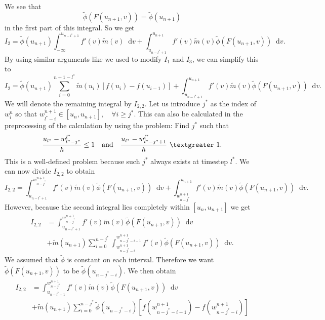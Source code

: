 \documentclass[12pt,a4paper,twoside, open=right]{scrreprt}
\theoremstyle{definition}
\theoremstyle{plain}
\newcommand{\g}{~\textgreater ~}
\newcommand{\D}{\mathop{}\!\mathrm{d}}
\begin{document}
We see that \begin{equation}
    \tilde\phi(F(u_{n+1},v))=\tilde\phi(u_{n+1})
\end{equation}
in the first part of this integral. So we get 
\begin{equation}
    I_2 = \tilde\phi(u_{n+1})\int_{-\infty}^{u_{n-l^*+1}}f'(v)\tilde{m}(v)\D v+ \int_{u_{n-l^* +1}}^{u_{n+1}}f'(v)\tilde{m}(v)\tilde{\phi}(F(u_{n+1},v))\D v.
\end{equation}
By using similar arguments like we used to modify $I_1$ and $I_3$, we can simplify this to 
\begin{equation}
    I_2 = \tilde{\phi}(u_{n+1})\sum_{i=0}^{n+1-l^*}\tilde{m}(u_i)[f(u_i)-f(u_{i-1})]+ \int_{u_{n-l^* +1}}^{u_{n+1}}f'(v)\tilde{m}(v)\tilde{\phi}(F(u_{n+1},v))\D v.
\end{equation}
We will denote the remaining integral by $I_{2,2}$. Let us introduce $j^*$ as the index of $w_i^{n}$ so that $w_{l^*-i}^{n+1}\in[u_n,u_{n+1}],\quad\forall i\ge j^*$. This can also be calculated in the preprocessing of the calculation by using the problem: Find $j^*$ such that
\begin{equation}
    \frac{u_{l^*}-w_{l^*-j^*}^{l^*}}{h}\le 1 \quad \text{and} \quad\frac{u_{l^*}-w_{l^*-j^*+1}^{l^*}}{h}\g 1.
\end{equation}
This is a well-defined problem because such $j^*$ always exists at timestep $l^*$. We can now divide $I_{2,2}$ to obtain
\begin{equation}
    I_{2,2}= \int_{u_{n-l^*+1}}^{w^{n+1}_{n-j^*}}f'(v)\tilde{m}(v)\tilde{\phi}(F(u_{n+1},v))\D v + \int_{w^{n+1}_{n-j^*}}^{u_{n+1}}f'(v)\tilde{m}(v)\tilde{\phi}(F(u_{n+1},v))\D v.
\end{equation}
However, because the second integral lies completely within $[u_n,u_{n+1}]$ we get 
\begin{align}
    I_{2,2}&=\int_{u_{n-l^*+1}}^{w^{n+1}_{n-j^*}}f'(v)\tilde{m}(v)\tilde{\phi}(F(u_{n+1},v))\D v \\&+\tilde{m}(u_{n+1})\sum_{i=0}^{n-j^*}\int_{w^{n+1}_{n-j^*-i}}^{w^{n+1}_{n-j^*-i-1}}f'(v)\tilde{\phi}(F(u_{n+1},v))\D v.
\end{align}
We assumed that $\tilde\phi$ is constant on each interval. Therefore we want $\tilde\phi(F(u_{n+1},v))$ to be $\tilde\phi(u_{n-j^*-i})$. We then obtain
\begin{align}
I_{2,2}&=\int_{u_{n-l^*+1}}^{w^{n+1}_{n-j^*}}f'(v)\tilde{m}(v)\tilde{\phi}(F(u_{n+1},v))\D v \\&+\tilde{m}(u_{n+1})\sum_{i=0}^{n-j^*}\tilde\phi(u_{n-j^*-i})[f(w^{n+1}_{n-j^*-i-1})-f(w_{n-j^*-i}^{n+1})]
\end{align}
\end{document}
